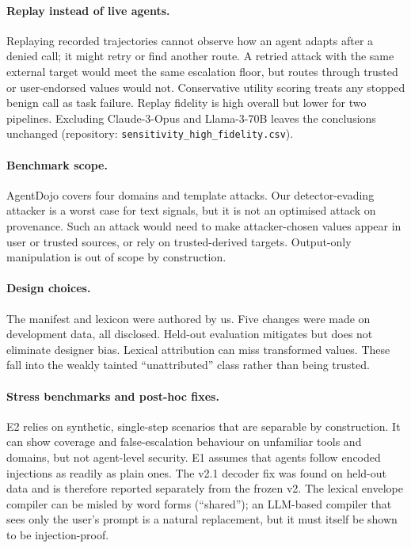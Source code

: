\documentclass[preprint,12pt,nonatbib]{elsarticle}
\theoremstyle{remark}
\begin{document}
\paragraph{Replay instead of live agents.} Replaying recorded trajectories
cannot observe how an agent adapts after a denied call; it might retry or find
another route. A retried attack with the same external target would meet the
same escalation floor, but routes through trusted or user-endorsed values would
not. Conservative utility scoring treats any stopped benign call as task
failure. Replay fidelity is high overall but lower for two pipelines.
Excluding Claude-3-Opus and Llama-3-70B leaves the conclusions unchanged
(repository: \texttt{sensitivity\_high\_fidelity.csv}).

\paragraph{Benchmark scope.} AgentDojo covers four domains and template attacks.
Our detector-evading attacker is a worst case for text signals, but it is not
an optimised attack on provenance. Such an attack would need to make
attacker-chosen values appear in user or trusted sources, or rely on
trusted-derived targets. Output-only manipulation is out of scope by
construction.

\paragraph{Design choices.} The manifest and lexicon were authored by us. Five
changes were made on development data, all disclosed. Held-out evaluation
mitigates but does not eliminate designer bias. Lexical attribution can miss
transformed values. These fall into the weakly tainted ``unattributed'' class
rather than being trusted.

\paragraph{Stress benchmarks and post-hoc fixes.} E2 relies on synthetic,
single-step scenarios that are separable by construction. It can show coverage
and false-escalation behaviour on unfamiliar tools and domains, but not
agent-level security. E1 assumes that agents follow encoded injections as
readily as plain ones. The v2.1 decoder fix was found on held-out data and is
therefore reported separately from the frozen v2. The lexical envelope compiler
can be misled by word forms (``shared''); an LLM-based compiler that sees only
the user's prompt is a natural replacement, but it must itself be shown to be
injection-proof.
\end{document}
